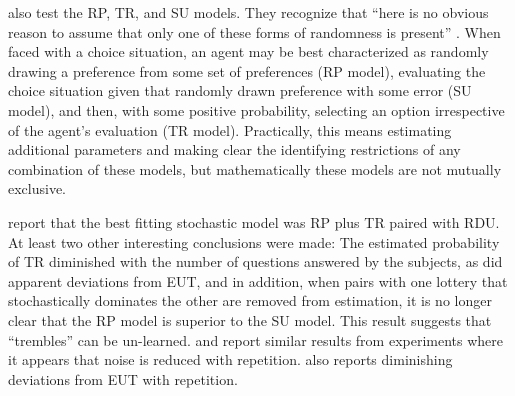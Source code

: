 \documentclass[../main.tex]{subfiles}
\begin{document}
\textcite{Loomes2002} also test the RP, TR, and SU models.
They recognize that \enquote{here is no obvious reason to assume that only one of these forms of randomness is present} \parencite*[106]{Loomes2002}.{\footnotemark}
When faced with a choice situation, an agent may be best characterized as randomly drawing a preference from some set of preferences (RP model), evaluating the choice situation given that randomly drawn preference with some error (SU model), and then, with some positive probability, selecting an option irrespective of the agent's evaluation (TR model).
Practically, this means estimating additional parameters and making clear the identifying restrictions of any combination of these models, but mathematically these models are not mutually exclusive.{\footnotemark}

\addtocounter{footnote}{-2}

\textcite{Loomes2002} report that the best fitting stochastic model was RP plus TR paired with RDU.
At least two other interesting conclusions were made: The estimated probability of TR diminished with the number of questions answered by the subjects, as did apparent deviations from EUT, and in addition, when pairs with one lottery that stochastically dominates the other are removed from estimation, it is no longer clear that the RP model is superior to the SU model.
This result suggests that \enquote{trembles} can be un-learned.
\textcite{Hey2001} and \textcite{Moffatt2002} report similar results from experiments where it appears that noise is reduced with repetition.
\textcite{Hey2001} also reports diminishing deviations from EUT with repetition.
\end{document}
